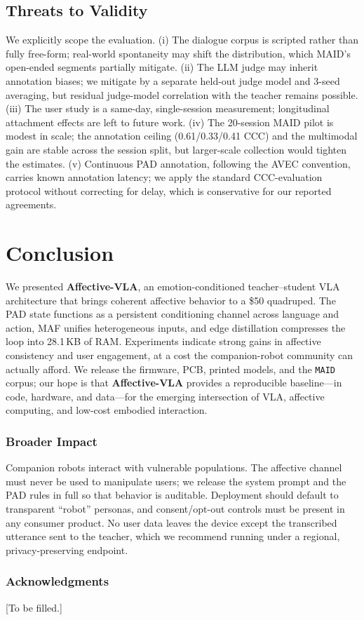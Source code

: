 \documentclass{article}
\newcommand{\method}{\textbf{Affective-VLA}}
\theoremstyle{definition}
\begin{document}
\subsection{Threats to Validity}

We explicitly scope the evaluation. (i) The dialogue corpus is scripted rather
than fully free-form; real-world spontaneity may shift the distribution, which
MAID's open-ended segments partially mitigate. (ii) The LLM judge may inherit
annotation biases; we mitigate by a separate held-out judge model and 3-seed
averaging, but residual judge-model correlation with the teacher remains
possible. (iii) The user study is a same-day, single-session measurement;
longitudinal attachment effects \cite{shibata2004paro} are left to future
work. (iv) The 20-session MAID pilot is modest in scale; the annotation
ceiling (0.61/0.33/0.41 CCC) and the multimodal gain are stable across the
session split, but larger-scale collection would tighten the estimates.
(v) Continuous PAD annotation, following the AVEC convention, carries known
annotation latency; we apply the standard CCC-evaluation protocol without
correcting for delay, which is conservative for our reported agreements.

\section{Conclusion}

We presented \method{}, an emotion-conditioned teacher--student VLA architecture
that brings coherent affective behavior to a \$50 quadruped. The PAD state
functions as a persistent conditioning channel across language and action,
MAF unifies heterogeneous inputs, and edge distillation compresses the loop into
28.1\,KB of RAM. Experiments indicate strong gains in affective consistency and
user engagement, at a cost the companion-robot community can actually afford.
We release the firmware, PCB, printed models, and the \texttt{MAID} corpus; our
hope is that \method{} provides a reproducible baseline---in code, hardware,
and data---for the emerging intersection of VLA, affective computing, and
low-cost embodied interaction.

\subsubsection*{Broader Impact}
Companion robots interact with vulnerable populations. The affective channel
must never be used to manipulate users; we release the system prompt and the
PAD rules in full so that behavior is auditable. Deployment should default to
transparent ``robot'' personas, and consent/opt-out controls must be present in
any consumer product. No user data leaves the device except the transcribed
utterance sent to the teacher, which we recommend running under a regional,
privacy-preserving endpoint.

\subsubsection*{Acknowledgments}
[To be filled.]



\end{document}
